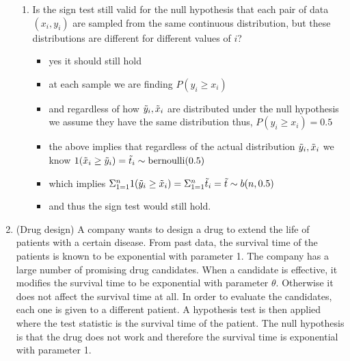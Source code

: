 \documentclass[12pt,twoside]{article}
\begin{document}
\begin{enumerate}
\begin{enumerate}
\item Is the sign test still valid for the null hypothesis that each pair of data $(x_i,y_i)$ are sampled from the same continuous distribution, but these distributions are different for different values of $i$?   
\begin{itemize}
  \color{blue}
  \item yes it should still hold
  \item at each sample we are finding $P(y_i\geq x_i)$
  \item and regardless of how $\Tilde{y}_i,\tilde{x}_i$ are distributed under the null hypothesis we assume they have the same distribution thus, $P(y_i\geq x_i)=0.5$ 
  \item the above implies that regardless of the actual distribution  $\Tilde{y}_i,\tilde{x}_i$ we know $1(\tilde{x}_i\geq \Tilde{y}_i)=\tilde{t}_i\sim \text{bernoulli}(0.5)$
  \item which implies $\Sigma_{1=1}^{n}1(\Tilde{y}_i\geq \tilde{x}_i)=\Sigma_{1=1}^{n}\tilde{t}_i=\tilde{t}\sim b(n,0.5)$
  \item and thus the sign test would still hold. 
\end{itemize}
\newpage
\end{enumerate}

\item (Drug design) 
A company wants to design a drug to extend the life of patients with a certain disease. From past data, the survival time of the patients is known to be exponential with parameter 1. The company has a large number of promising drug candidates. When a candidate is effective, it modifies the survival time to be exponential with parameter $\theta$. Otherwise it does not affect the survival time at all. In order to evaluate the candidates, each one is given to a different patient. A hypothesis test is then applied where the test statistic is the survival time of the patient. The null hypothesis is that the drug does not work and therefore the survival time is exponential with parameter 1. 


\end{enumerate}
\end{document}
